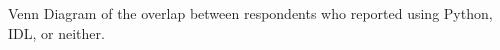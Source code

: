 \label{fig:venn}

Venn Diagram of the overlap between respondents who reported using Python, IDL, or neither.